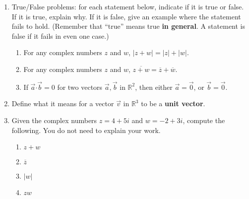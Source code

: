 \documentclass[12pt]{article}
\newcommand{\points}[1]{\marginpar{\hspace{24pt}[#1]}}
\newcommand{\R}{\mathbb{R}}
\newcommand{\dotp}{\boldsymbol{\cdot}}
\newcommand{\abs}[1]{\lvert #1\rvert}
\begin{document}
\begin{enumerate}
 \item True/False problems: for each statement below, indicate if it is true or false. If it is true, explain why. If it is false, give an example where the statement fails to hold. (Remember that ``true'' means true \textbf{in general}. A statement is false if it fails in even one case.) 

 \begin{enumerate}
   \item For any complex numbers $z$ and $w$, $\abs{z+w} = \abs{z}+\abs{w}$. \points{3}

\vspace{1.75in}

 \item For any complex numbers $z$ and $w$, $\overline{z+w} = \overline{z} + \overline{w}$. \points{3}

\vspace{1.75in}

 \item If $\vec{a}\dotp\vec{b}=0$ for two vectors $\vec{a},\vec{b}$ in $\R^2$, then either $\vec{a}=\vec{0}$, or $\vec{b}=\vec{0}$.\points{3}

\vspace{1.75in}

 \end{enumerate}

 \item Define what it means for a vector $\vec{v}$ in $\R^3$ to be a \textbf{unit vector}.\points{3}

\newpage

\item Given the complex numbers $z=4+5i$ and $w=-2+3i$, compute the following. You do not need to explain your work.
 \begin{enumerate}
\item $z+w$ \points{2}

\vspace{1in}

\item $\overline{z}$ \points{2}

\vspace{1in}

\item $\abs{w}$ \points{2}

\vspace{1.25in}

\item $zw$ \points{3}


\end{enumerate}
\end{enumerate}
\end{document}
